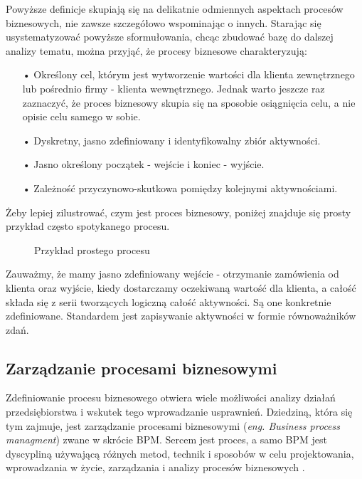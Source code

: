 Powyższe definicje skupiają się na delikatnie odmiennych aspektach procesów biznesowych, nie zawsze szczegółowo wspominając o innych. Starając się usystematyzować powyższe sformułowania, chcąc zbudować bazę do dalszej analizy tematu, można przyjąć, że procesy biznesowe charakteryzują:
\begin{itemize}
  \item[•] Określony cel, którym jest wytworzenie wartości dla klienta zewnętrznego lub pośrednio firmy - klienta wewnętrznego. Jednak warto jeszcze raz zaznaczyć, że proces biznesowy skupia się na sposobie osiągnięcia celu, a nie opisie celu samego w sobie. 
  \item[•] Dyskretny, jasno zdefiniowany i identyfikowalny zbiór aktywności. 
  \item[•] Jasno określony początek - wejście i koniec - wyjście.
  \item[•] Zależność przyczynowo-skutkowa pomiędzy kolejnymi aktywnościami.
\end{itemize}

Żeby lepiej zilustrować, czym jest proces biznesowy, poniżej znajduje się prosty przykład często spotykanego procesu.

\begin{figure}[h]
	\caption{\label{fig:simple_business_process}Przykład prostego procesu}
\end{figure}

Zauważmy, że mamy jasno zdefiniowany wejście - otrzymanie zamówienia od klienta oraz wyjście, kiedy dostarczamy oczekiwaną wartość dla klienta, a całość składa się z serii tworzących logiczną całość aktywności. Są one konkretnie zdefiniowane. Standardem jest zapisywanie aktywności w formie równoważników zdań.


\subsection{Zarządzanie procesami biznesowymi}
Zdefiniowanie procesu biznesowego otwiera wiele możliwości analizy działań przedsiębiorstwa i wskutek tego wprowadzanie usprawnień. Dziedziną, która się tym zajmuje, jest zarządzanie procesami biznesowymi (\textit{eng. Business process managment}) zwane w skrócie BPM. Sercem jest proces, a samo BPM jest dyscypliną używającą różnych metod, technik i sposobów w celu projektowania, wprowadzania w życie, zarządzania i analizy procesów biznesowych \cite{BPMDemystified}. 

